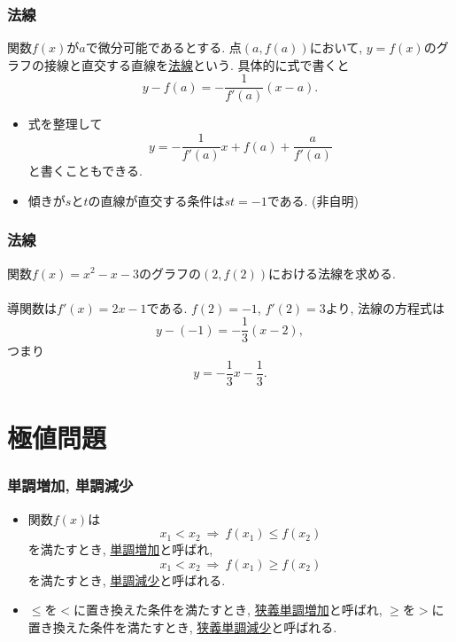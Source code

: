 \begin{frame}
\frametitle{法線}


\begin{Def}
関数$f(x)$が$a$で微分可能であるとする. 
点$(a,f(a))$において, $y=f(x)$のグラフの接線と直交する直線を\underline{法線}という. 
具体的に式で書くと
$$
y-f(a)=-\frac{1}{f'(a)}(x-a). 
$$
\end{Def}
\begin{itemize}
\item 式を整理して
$$
y=-\frac{1}{f'(a)}x + f(a) +\frac{a}{f'(a)}
$$
と書くこともできる.  
\item 傾きが$s$と$t$の直線が直交する条件は$st=-1$である. (非自明)
\end{itemize}

\end{frame}









\begin{frame}
\frametitle{法線}


関数$f(x)=x^2-x-3$のグラフの$(2,f(2))$における法線を求める. \\
\ \\

導関数は$f'(x)=2x-1$である. 
$f(2)=-1$, $f'(2)=3$より, 法線の方程式は
$$
y-(-1)=-\frac{1}{3}(x-2), 
$$
つまり
$$
y=-\frac{1}{3}x-\frac{1}{3}.  
$$




\end{frame}





\section{極値問題}



\begin{frame}
\frametitle{単調増加, 単調減少}


\begin{Def}
\begin{itemize}
\item 関数$f(x)$は
$$
x_1 < x_2 \ \Rightarrow \ f(x_1)  \le f(x_2)
$$
を満たすとき, \underline{単調増加}と呼ばれ, 
$$
x_1 < x_2 \ \Rightarrow \ f(x_1)  \ge f(x_2)
$$
を満たすとき, \underline{単調減少}と呼ばれる. 
\item $\le$を$<$に置き換えた条件を満たすとき, \underline{狭義単調増加}と呼ばれ, 
$\ge$を$>$に置き換えた条件を満たすとき, \underline{狭義単調減少}と呼ばれる. 
\end{itemize}
\end{Def}




\end{frame}


